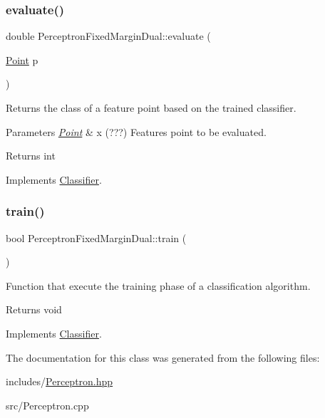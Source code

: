 \subsubsection{\texorpdfstring{evaluate()}{evaluate()}}
{\footnotesize\ttfamily double Perceptron\+Fixed\+Margin\+Dual\+::evaluate (\begin{DoxyParamCaption}\item[{\hyperlink{class_point}{Point}}]{p }\end{DoxyParamCaption})\hspace{0.3cm}{\ttfamily [virtual]}}



Returns the class of a feature point based on the trained classifier. 


\begin{DoxyParams}{Parameters}
{\em \hyperlink{class_point}{Point}} & x (???) Features point to be evaluated. \\
\hline
\end{DoxyParams}
\begin{DoxyReturn}{Returns}
int 
\end{DoxyReturn}


Implements \hyperlink{class_classifier_ae8e9554823b85ddc2dcad2955da811d9}{Classifier}.

\mbox{\label{class_perceptron_fixed_margin_dual_aa095c90a3d04f70e1cf2e38e2afa769b}} 
\subsubsection{\texorpdfstring{train()}{train()}}
{\footnotesize\ttfamily bool Perceptron\+Fixed\+Margin\+Dual\+::train (\begin{DoxyParamCaption}{ }\end{DoxyParamCaption})\hspace{0.3cm}{\ttfamily [virtual]}}



Function that execute the training phase of a classification algorithm. 

\begin{DoxyReturn}{Returns}
void 
\end{DoxyReturn}


Implements \hyperlink{class_classifier_a2306a5de27555ab093593ac9642bc7d9}{Classifier}.



The documentation for this class was generated from the following files\+:\begin{DoxyCompactItemize}
\item 
includes/\hyperlink{_perceptron_8hpp}{Perceptron.\+hpp}\item 
src/Perceptron.\+cpp\end{DoxyCompactItemize}
